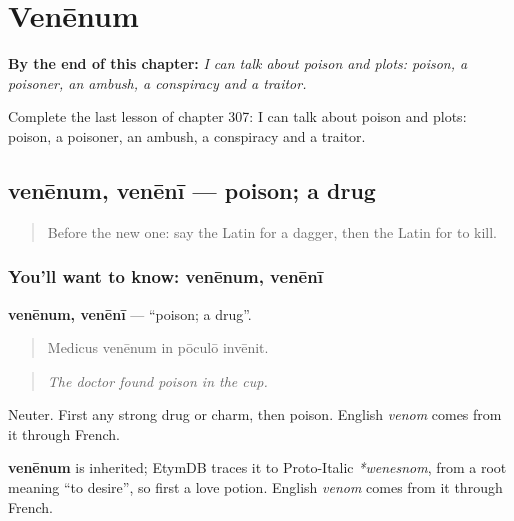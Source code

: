 
\chapter{Venēnum}
\label{ch:la-venenum}

\begin{chapteropening}
\textbf{By the end of this chapter:} \emph{I can talk about poison and plots: poison, a poisoner, an ambush, a conspiracy and a traitor.}

Complete the last lesson of chapter 307: I can talk about poison and plots: poison, a poisoner, an ambush, a conspiracy and a traitor.
\end{chapteropening}

\section[venēnum, venēnī]{venēnum, venēnī — poison; a drug}

\label{lesson:LA-C307-venenum}



\begin{quote}
Before the new one: say the Latin for a dagger, then the Latin for to kill.
\end{quote}

\subsection*{You'll want to know: venēnum, venēnī}
\textbf{venēnum, venēnī} — \textquotedblleft{}poison; a drug\textquotedblright{}.

\begin{quote}
Medicus venēnum in pōculō invēnit.
\end{quote}

\begin{quote}
\emph{The doctor found poison in the cup.}
\end{quote}

Neuter. First any strong drug or charm, then poison. English \emph{venom} comes from it through French.

\begin{cousinweb}
\textbf{venēnum} is inherited; EtymDB traces it to Proto-Italic \emph{*wenesnom}, from a root meaning \textquotedblleft{}to desire\textquotedblright{}, so first a love potion. English \emph{venom} comes from it through French.
\end{cousinweb}

